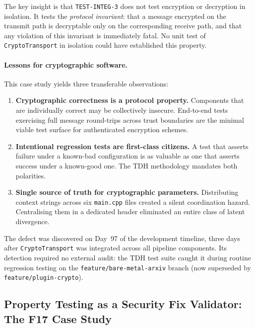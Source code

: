 \documentclass[11pt,a4paper]{article}
\begin{document}
    The key insight is that \texttt{TEST-INTEG-3} does not test encryption or
    decryption in isolation. It tests the \emph{protocol invariant}: that a
    message encrypted on the transmit path is decryptable only on the
    corresponding receive path, and that any violation of this invariant is
    immediately fatal. No unit test of \texttt{CryptoTransport} in isolation
    could have established this property.

    \paragraph{Lessons for cryptographic software.}
    This case study yields three transferable observations:

    \begin{enumerate}
        \item \textbf{Cryptographic correctness is a protocol property.}
        Components that are individually correct may be collectively
        insecure. End-to-end tests exercising full message round-trips
        across trust boundaries are the minimal viable test surface for
        authenticated encryption schemes.

        \item \textbf{Intentional regression tests are first-class citizens.}
        A test that asserts failure under a known-bad configuration is as
        valuable as one that asserts success under a known-good one. The
        TDH methodology mandates both polarities.

        \item \textbf{Single source of truth for cryptographic parameters.}
        Distributing context strings across six \texttt{main.cpp} files
        created a silent coordination hazard. Centralising them in a
        dedicated header eliminated an entire class of latent divergence.
    \end{enumerate}

    The defect was discovered on Day~97 of the development timeline, three days
    after \texttt{CryptoTransport} was integrated across all pipeline components.
    Its detection required no external audit: the TDH test suite caught it during
    routine regression testing on the \texttt{feature/bare-metal-arxiv} branch
    (now superseded by \texttt{feature/plugin-crypto}).


    \subsection{Property Testing as a Security Fix Validator: The F17 Case Study}
    \label{subsec:property-testing-validator}
\end{document}
